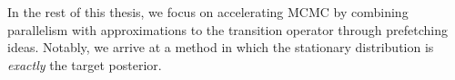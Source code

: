 \documentclass[angelino.tex]{subfiles}
\begin{document}

\bigskip

In the rest of this thesis, we focus on accelerating MCMC by combining
parallelism with approximations to the transition operator through
prefetching ideas.
Notably, we arrive at a method in which the stationary distribution is 
\emph{exactly} the target posterior.

\end{document}
